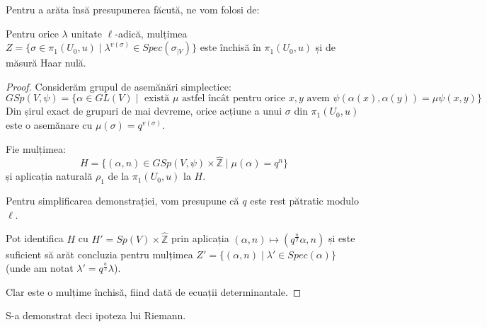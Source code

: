 \documentclass[13pt,openany]{book}
\begin{document}
Pentru a arăta însă presupunerea făcută, ne vom folosi de:

\begin{prop}
Pentru orice $\lambda$ unitate $\ell$-adică, mulțimea $Z=\{\sigma \in \pi_1(U_0,u) \mid \lambda^{v(\sigma)} \in Spec(\sigma_{\mid V})\}$ este închisă în $\pi_1(U_0,u)$ și de măsură Haar nulă.
\end{prop}

\begin{proof}
Considerăm grupul de asemănări simplectice:
$$GSp(V,\psi)=\{\alpha\in GL(V) \mid \text{ există } \mu \text{ astfel încât pentru orice } x,y \text{ avem } \psi(\alpha(x),\alpha(y))=\mu\psi(x,y)\}$$
Din șirul exact de grupuri de mai devreme, orice acțiune a unui $\sigma$ din $\pi_1(U_0,u)$ este o asemănare cu $\mu(\sigma)=q^{v(\sigma)}$.

Fie mulțimea:
$$H=\{(\alpha,n)\in GSp(V,\psi) \times \hat{\mathbb{Z}} \mid \mu(\alpha)=q^n\}$$
și aplicația naturală $\rho_1$ de la $\pi_1(U_0,u)$ la $H$.

Pentru simplificarea demonstrației, vom presupune că $q$ este rest pătratic modulo $\ell$.

Pot identifica $H$ cu $H'=Sp(V) \times \hat{\mathbb{Z}}$ prin aplicația $(\alpha,n)\mapsto(q^{\frac{n}{2}}\alpha,n)$ și este suficient să arăt concluzia pentru mulțimea $Z'=\{(\alpha,n)\mid\lambda'\in Spec(\alpha)\}$ (unde am notat $\lambda'=q^{\frac{n}{2}}\lambda$).

Clar este o mulțime închisă, fiind dată de ecuații determinantale.
\end{proof}

S-a demonstrat deci ipoteza lui Riemann.






















\end{document}
